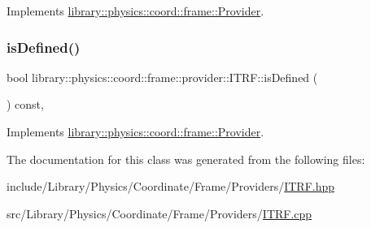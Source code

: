 Implements \hyperlink{classlibrary_1_1physics_1_1coord_1_1frame_1_1_provider_a796fd2dd337f1304a0e9acf573ce2550}{library\+::physics\+::coord\+::frame\+::\+Provider}.

\mbox{\label{classlibrary_1_1physics_1_1coord_1_1frame_1_1provider_1_1_i_t_r_f_a10a6a129ab5410f3ad3d687f73ba6d8e}} 
\subsubsection{\texorpdfstring{is\+Defined()}{isDefined()}}
{\footnotesize\ttfamily bool library\+::physics\+::coord\+::frame\+::provider\+::\+I\+T\+R\+F\+::is\+Defined (\begin{DoxyParamCaption}{ }\end{DoxyParamCaption}) const\hspace{0.3cm}{\ttfamily [override]}, {\ttfamily [virtual]}}



Implements \hyperlink{classlibrary_1_1physics_1_1coord_1_1frame_1_1_provider_ae7cd093febf2b20f71400f9f79442774}{library\+::physics\+::coord\+::frame\+::\+Provider}.



The documentation for this class was generated from the following files\+:\begin{DoxyCompactItemize}
\item 
include/\+Library/\+Physics/\+Coordinate/\+Frame/\+Providers/\hyperlink{_i_t_r_f_8hpp}{I\+T\+R\+F.\+hpp}\item 
src/\+Library/\+Physics/\+Coordinate/\+Frame/\+Providers/\hyperlink{_i_t_r_f_8cpp}{I\+T\+R\+F.\+cpp}\end{DoxyCompactItemize}
